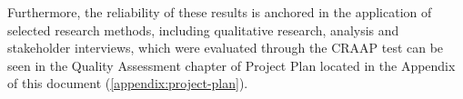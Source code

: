 Furthermore, the reliability of these results is anchored in the application of selected research methods,
including qualitative research, analysis and stakeholder interviews, which were evaluated through the CRAAP test
can be seen in the Quality Assessment chapter of Project Plan located in the Appendix of this document
(\ref{appendix:project-plan}).



